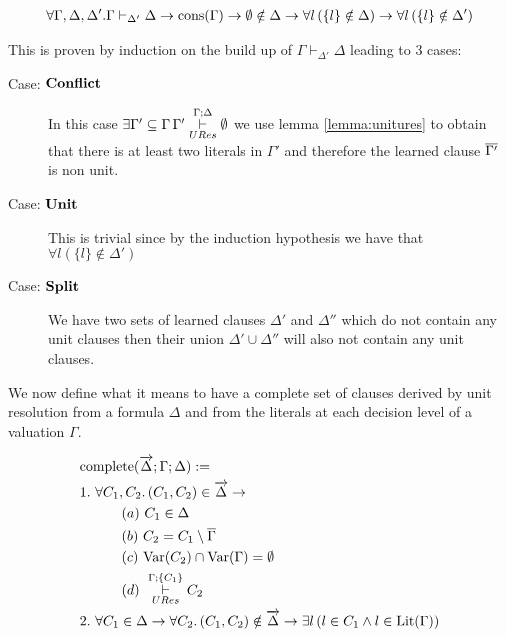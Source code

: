 \begin{mylemma}\label{lemma:unitdpll}
\begin{align*}
\forall \Gamma,\Delta,\Delta'.  \Gamma \vdash_{\Delta'} \Delta  \to \mathrm{cons}(\Gamma) \to  \emptyset \notin \Delta \to \forall l \,(\{ l\} \notin \Delta) \to   \forall l \,(\{ l\} \notin \Delta') 
\end{align*}
 
This is proven by induction on the build up of $\Gamma \vdash_{\Delta'} \Delta$ leading to 3 cases:

\begin{description}
\item[Case: $\mathbf{Conflict}$] In this case $\exists \Gamma' \subseteq \Gamma \, \Gamma' \overset{\Gamma;\Delta}{\underset{URes}{\vdash}} \emptyset$ we use lemma \ref{lemma:unitures} to obtain that there is at least two literals in $\Gamma'$ and therefore the learned clause $\overline{\Gamma'}$ is non unit. 
\item[Case: $\mathbf{Unit}$] This is trivial since by the induction hypothesis we have that $\forall l( \{ l \} \notin \Delta')$
\item[Case: $\mathbf{Split}$]
We have two sets of learned clauses $\Delta'$ and $\Delta''$ which do not contain any unit clauses then their union $\Delta' \cup \Delta''$ will also not contain any unit clauses.



\end{description}

\end{mylemma}



We now define what it means to have a complete set of clauses derived by unit resolution from a formula $\Delta$ and from the literals at each decision level of a valuation $\Gamma$.
\begin{mydef}
\begin{align*}
 &\mathrm{complete}(\overrightarrow{\Delta};\Gamma; \Delta) :=  \\
& 1. \ \forall C_1,C_2.  \, (C_1, C_2) \in \overrightarrow{\Delta} \to \\
& \hspace{30pt}  (a) \ C_1 \in \Delta \\
& \hspace{30pt}  (b) \ C_2 = C_1 \setminus \overline{\Gamma} \\
& \hspace{30pt}  (c) \ \mathrm{Var}(C_2) \cap \mathrm{Var}(\Gamma) = \emptyset \\
& \hspace{30pt}  (d) \  \overset{\Gamma;\{C_1 \}}{\underset{URes}{\vdash}} C_2 \\
&2. \ \forall C_1 \in \Delta \to \forall C_2. \, (C_1, C_2 ) \notin \overrightarrow{\Delta} \to \exists l \, (l \in C_1 \wedge l \in \mathrm{Lit}(\Gamma))
\end{align*}

\end{mydef}


